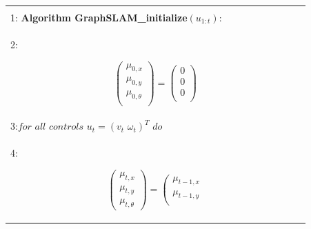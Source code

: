 \documentclass[10pt,a4paper]{article}
\begin{document}
\begin{table}[H]
\begin{center}
\begin{tabular}{|l|}
\hline
{}\\
1: \textbf{Algorithm GraphSLAM\_initialize}$(u_{1:t}):\qquad\qquad\qquad\qquad$ \\
2:\hspace{5mm}
\begin{minipage}{0.2\textwidth}
				\begin{equation*}
				\left(\begin{array}{c}
				\mu_{0,x}\\
				\mu_{0,y}\\
				
\mu_{0,\theta}\\
				\end{array}\right)
=
\left(\begin{array}{c}
0\\
0\\

0\\
\end{array}\right)				\end{equation*}
\end{minipage}\\
3:\hspace{5mm}$\textit{for all controls}\,\,u_t=(v_t\,\,\omega_t)^T\,\,\textit{do}$\\
4:\hspace{10mm}
\begin{minipage}{0.2\textwidth}
				\begin{equation*}
				\left(\begin{array}{c}
				\mu_{t,x}\\
				\mu_{t,y}\\
				
\mu_{t,\theta}
				\end{array}\right)
=
\left(\begin{array}{c}
\mu_{t-1,x}\\
\mu_{t-1,y}\\


\end{array}
\end{equation*}
\end{minipage}
\end{tabular}
\end{center}
\end{table}
\end{document}
